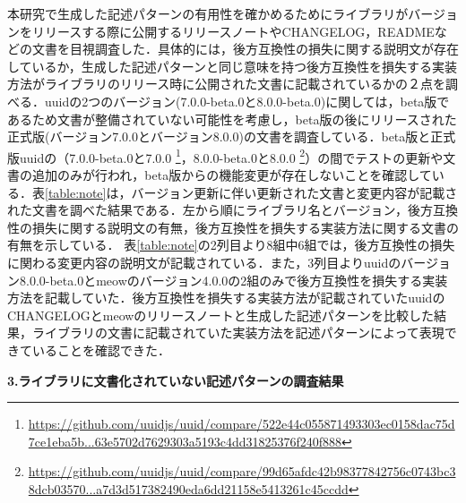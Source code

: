 \documentclass[11pt]{jreport}
\begin{document}


本研究で生成した記述パターンの有用性を確かめるためにライブラリがバージョンをリリースする際に公開するリリースノートやCHANGELOG，READMEなどの文書を目視調査した．具体的には，後方互換性の損失に関する説明文が存在しているか，生成した記述パターンと同じ意味を持つ後方互換性を損失する実装方法がライブラリのリリース時に公開された文書に記載されているかの２点を調べる．uuidの2つのバージョン(7.0.0-beta.0と8.0.0-beta.0)に関しては，beta版であるため文書が整備されていない可能性を考慮し，beta版の後にリリースされた正式版(バージョン7.0.0とバージョン8.0.0)の文書を調査している．beta版と正式版uuidの（7.0.0-beta.0と7.0.0
\footnote{\url{https://github.com/uuidjs/uuid/compare/522e44c055871493303ec0158dac75d7ce1eba5b...63e5702d7629303a5193c4dd31825376f240f888}}，8.0.0-beta.0と8.0.0
\footnote{\url{https://github.com/uuidjs/uuid/compare/99d65afdc42b98377842756c0743bc38dcb03570...a7d3d517382490eda6dd21158e5413261c45ccdd}}）の間でテストの更新や文書の追加のみが行われ，beta版からの機能変更が存在しないことを確認している．表\ref{table:note}は，バージョン更新に伴い更新された文書と変更内容が記載された文書を調べた結果である．左から順にライブラリ名とバージョン，後方互換性の損失に関する説明文の有無，後方互換性を損失する実装方法に関する文書の有無を示している． 表\ref{table:note}の2列目より8組中6組では，後方互換性の損失に関わる変更内容の説明文が記載されている．また，3列目よりuuidのバージョン8.0.0-beta.0とmeowのバージョン4.0.0の2組のみで後方互換性を損失する実装方法を記載していた．後方互換性を損失する実装方法が記載されていたuuidのCHANGELOGとmeowのリリースノートと生成した記述パターンを比較した結果，ライブラリの文書に記載されていた実装方法を記述パターンによって表現できていることを確認できた．

\textbf{\newline\newline}
\noindent\textbf{3.ライブラリに文書化されていない記述パターンの調査結果}
\end{document}

